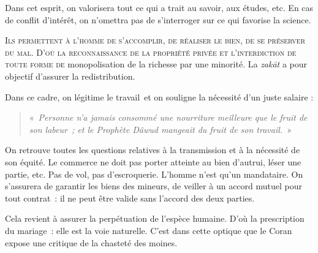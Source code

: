 Dans cet esprit, on valorisera tout ce qui a trait au savoir, aux
études, etc. En cas de conflit d'intérêt, on n'omettra pas de
s'interroger sur ce qui favorise la science.


\textsc{Ils permettent à l'homme de s'accomplir, de réaliser le bien, de
se préserver du mal. D'où la reconnaissance de la propriété privée et
l'interdiction de toute forme de} monopolisation de la richesse par une
minorité. La \emph{zakāt} a pour objectif d'assurer la redistribution.

Dans ce cadre, on légitime le travail~et on souligne la nécessité d'un
juste salaire : 
\begin{quote}
    «~\emph{Personne n'a jamais consommé une nourriture
meilleure que le fruit de son labeur~; et le Prophète Dâwud mangeait du
fruit de son travail.}~»
\end{quote}

On retrouve toutes les questions relatives à la transmission et à la
nécessité de son équité. Le commerce ne doit pas porter atteinte au bien
d'autrui, léser une partie, etc. Pas de vol, pas d'escroquerie. L'homme
n'est qu'un mandataire. On s'assurera de garantir les biens des mineurs,
de veiller à un accord mutuel pour tout contrat~: il ne peut être valide
sans l'accord des deux parties.


Cela revient à assurer la perpétuation de l'espèce humaine. D'où la
prescription du mariage~: elle est la voie naturelle. C'est dans cette
optique que le Coran expose une critique de la chasteté des moines.

